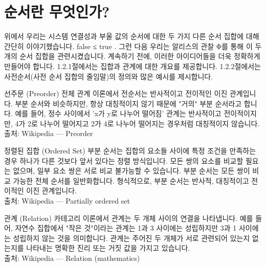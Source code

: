 \documentclass[11pt, a4paper, twoside, openany]{book}
\begin{document}
\section{순서란 무엇인가?}
\label{sec:1-2}

위에서 우리는 시스템 연결성과 부울 값의 순서에 대한 두 가지 다른 순서 집합에 대해 간단히 이야기했습니다.  false ≤ true . 그런 다음 우리는 알리스의 관찰 Φ를 통해 이 두 개의 순서 집합을 관련시켰습니다. 계속하기 전에, 이러한 아이디어들을 더욱 정확하게 만들어야 합니다. 1.2.1\hspace{0pt}절에서는 집합과 관계에 대한 개요를 제공합니다. 1.2.2\hspace{0pt}절에서는 사전순서(사전 순서 집합의 줄임말)의 정의와 많은 예시를 제시합니다.

\begin{deepresearch}{선주문 (Preorder)}
전체 관계 이론에서 전순서는 반사적이고 전이적인 이진 관계입니다. 부분 순서와 비슷하지만, 항상 대칭적이지 않기 때문에 "거의" 부분 순서라고 합니다. 예를 들어, 정수 사이에서 'x\hspace{0pt}가 y\hspace{0pt}로 나누어 떨어짐' 관계는 반사적이고 전이적이지만, 4\hspace{0pt}가 2\hspace{0pt}로 나누어 떨어지고 2\hspace{0pt}가 4\hspace{0pt}로 나누어 떨어지는 경우처럼 대칭적이지 않습니다.
\\[4pt]{\footnotesize\color{ctgray} 출처: Wikipedia — Preorder}
\end{deepresearch}

\begin{deepresearch}{정렬된 집합 (Ordered Set)}
부분 순서는 집합의 요소들 사이에 특정 조건을 만족하는 경우 하나가 다른 것보다 앞서 있다는 정렬 방식입니다. 모든 쌍의 요소를 비교할 필요는 없으며, 일부 요소 쌍은 서로 비교 불가능할 수 있습니다. 부분 순서는 모든 쌍이 비교 가능한 전체 순서를 일반화합니다.  형식적으로, 부분 순서는 반사적, 대칭적이고 전이적인 이진 관계입니다.
\\[4pt]{\footnotesize\color{ctgray} 출처: Wikipedia — Partially ordered set}
\end{deepresearch}

\begin{deepresearch}{관계 (Relation)}
카테고리 이론에서 관계는 두 개체 사이의 연결을 나타냅니다. 예를 들어, 자연수 집합에서 "작은 것"이라는 관계는 1\hspace{0pt}과 3 사이에는 성립하지만 3\hspace{0pt}과 1 사이에는 성립하지 않는 것을 의미합니다.  관계는 주어진 두 개체가 서로 관련되어 있는지 없는지를 나타내는 명확한 진리 또는 거짓 값을 가지고 있습니다.
\\[4pt]{\footnotesize\color{ctgray} 출처: Wikipedia — Relation (mathematics)}
\end{deepresearch}
\end{document}
